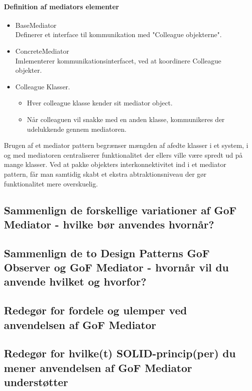 \paragraph{Definition af mediators elementer}
\begin{itemize}
	\item BaseMediator\\
	Definerer et interface til kommunikation med "Colleague objekterne".
	\item ConcreteMediator\\
	Imlementerer kommunikationsinterfacet, ved at koordinere Colleague objekter.
	\item Colleague Klasser.
	\begin{itemize}
		\item Hver colleague klasse kender sit mediator object.
		\item Når colleaguen vil snakke med en anden klasse, kommunikeres der udelukkende gennem
		mediatoren.
	\end{itemize}
\end{itemize}

Brugen af et mediator pattern begrænser mængden af afedte klasser i et system, i og med
mediatoren centraliserer funktionalitet der ellers ville være spredt ud på mange klasser. Ved at
pakke objekters interkonnektivitet ind i et mediator pattern, får man samtidig skabt et ekstra
abtraktionsniveau der gør funktionalitet mere overskuelig.

\subsection{Sammenlign de forskellige variationer af GoF Mediator - hvilke bør anvendes hvornår?}

\subsection{Sammenlign de to Design Patterns GoF Observer og GoF Mediator - hvornår vil du anvende hvilket og hvorfor?}

\subsection{Redegør for fordele og ulemper ved anvendelsen af GoF Mediator}

\subsection{Redegør for hvilke(t) SOLID-princip(per) du mener anvendelsen af GoF Mediator understøtter}